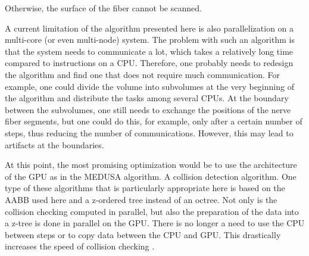 Otherwise, the surface of the fiber cannot be scanned.
\par
% 
A current limitation of the algorithm presented here is also parallelization on a multi-core (or even multi-node) system.
The problem with such an algorithm is that the system needs to communicate a lot, which takes a relatively long time compared to instructions on a \ac{CPU}.
Therefore, one probably needs to redesign the algorithm and find one that does not require much communication.
For example, one could divide the volume into subvolumes at the very beginning of the algorithm and distribute the tasks among several \acp{CPU}.
At the boundary between the subvolumes, one still needs to exchange the positions of the nerve fiber segments, but one could do this, for example, only after a certain number of steps, thus reducing the number of communications.
However, this may lead to artifacts at the boundaries.
\par
% 
At this point, the most promising optimization would be to use the architecture of the \ac{GPU} as in the \ac{MEDUSA} algorithm.
A collision detection algorithm.
One type of these algorithms that is particularly appropriate here is based on the \ac{AABB} used here and a z-ordered tree instead of an octree.
Not only is the collision checking computed in parallel, but also the preparation of the data into a z-tree is done in parallel on the \ac{GPU}.
There is no longer a need to use the \ac{CPU} between steps or to copy data between the \ac{CPU} and \ac{GPU}.
This drastically increases the speed of collision checking \cite{Karras2012}. 
% 
% 
% 
